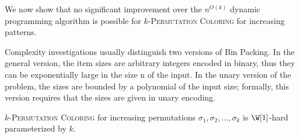 We now show that no significant improvement over the $n^{O(k)}$ dynamic programming algorithm
is possible for \textsc{$k$-Permutation Coloring}
for increasing patterns.

Complexity investigations usually distinguish two versions of Bin Packing. In the general
version, the item sizes are arbitrary integers encoded in binary, thus they can be exponentially
large in the size n of the input. In the unary version of the problem, the sizes are bounded by
a polynomial of the input size; formally, this version requires that the sizes are given in unary
encoding.

\begin{proposition}
  \label{proposition:Monotonic Permutation Coloring}
  \textsc{$k$-Permutation Coloring} for increasing permutations
  $\sigma_1, \sigma_2, \dots, \sigma_k$ is
  $\W[1]$-hard parameterized by $k$.
\end{proposition}

